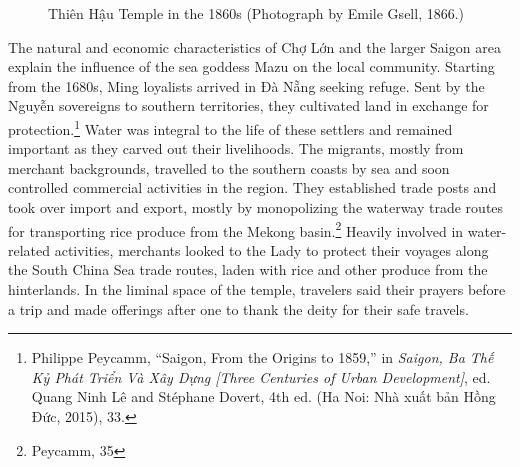\begin{figure}[!ht]
\begin{center}
\vspace{-.2 in}
\caption[\vi Thiên Hậu Temple in the 1860s \en]{\vi Thiên Hậu Temple in the 1860s (Photograph by Emile Gsell, 1866.\footnotemark)\en}\label{thienhau_past}
\end{center}
\vspace{-.35 in}
\end{figure}
\vi
The natural and economic characteristics of Chợ Lớn and the larger Saigon area explain the influence of the sea goddess Mazu on the local community. Starting from the 1680s, Ming loyalists arrived in Đà Nẵng seeking refuge. Sent by the Nguyễn sovereigns to southern territories, they cultivated  land in exchange for protection.\footnote{Philippe Peycamm, “Saigon, From the Origins to 1859,” in \textit{Saigon, Ba Thế Kỷ Phát Triển Và Xây Dựng [Three Centuries of Urban Development]}, ed. Quang Ninh Lê and Stéphane Dovert, 4th ed. (Ha Noi: Nhà xuất bản Hồng Đức, 2015), 33.} Water was integral to the life of these settlers and remained important as they carved out their livelihoods. The migrants, mostly from merchant backgrounds, travelled to the southern coasts by sea and soon controlled commercial activities in the region. They established trade posts and took over import and export, mostly by monopolizing the waterway trade routes for transporting rice produce from the Mekong basin.\footnote{Peycamm, 35} Heavily involved in water-related activities, merchants looked to the Lady to protect their voyages along the South China Sea trade routes, laden with rice and other produce from the hinterlands. In the liminal space of the temple, travelers said their prayers before a trip and made offerings after one to thank the deity for their safe travels.

